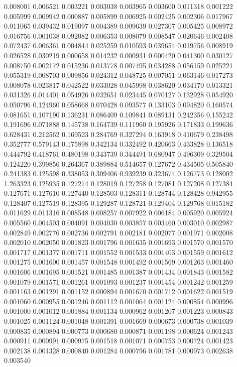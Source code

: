 0.008001
0.006521
0.003221
0.003038
0.003965
0.003600
0.011318
0.001222
0.005999
0.009942
0.000887
0.005899
0.006925
0.002425
0.002306
0.017967
0.011065
0.039432
0.019097
0.004389
0.009639
0.027307
0.005425
0.008972
0.016756
0.001038
0.092082
0.006353
0.008079
0.008547
0.020646
0.002408
0.072437
0.006361
0.004844
0.025259
0.010593
0.039654
0.019756
0.008919
0.026528
0.030219
0.000658
0.014232
0.000931
0.000420
0.041300
0.030127
0.008750
0.002172
0.015236
0.013778
0.007495
0.034288
0.056159
0.025221
0.055319
0.008703
0.009856
0.024312
0.048725
0.007051
0.063146
0.017273
0.008078
0.023817
0.042522
0.033028
0.045998
0.038620
0.034170
0.013321
0.031326
0.014401
0.054926
0.032651
0.023445
0.070127
0.132928
0.054920
0.050796
0.124960
0.058668
0.070428
0.093577
0.133103
0.094820
0.160574
0.081651
0.107190
0.136231
0.086409
0.109841
0.089131
0.242356
0.155242
0.191696
0.071888
0.145738
0.164739
0.111960
0.195926
0.171833
0.199636
0.628431
0.212562
0.169523
0.284769
0.327294
0.163918
0.410679
0.238498
0.352777
0.579143
0.175898
0.342134
0.332492
0.420663
0.433828
0.136518
0.444792
0.418761
0.480198
0.343739
0.344491
0.680947
0.496309
0.329504
0.124220
0.399856
0.264367
0.389884
0.514657
0.127672
0.434505
0.505840
0.241383
0.125598
0.338053
0.309406
0.939239
0.323674
0.126773
0.128002
1.263323
0.125935
0.127274
0.128019
0.127258
0.127081
0.127208
0.127384
0.127671
0.127610
0.127440
0.128503
0.128311
0.128744
0.128428
0.942955
0.128407
0.127519
0.128395
0.129287
0.128721
0.129404
0.129768
0.015182
0.011629
0.011316
0.008548
0.008257
0.007922
0.006184
0.005920
0.005924
0.005560
0.004503
0.004091
0.004030
0.003857
0.003460
0.003010
0.002987
0.002849
0.002776
0.002736
0.002791
0.002181
0.002077
0.001971
0.002008
0.002010
0.002050
0.001823
0.001796
0.001635
0.001693
0.001570
0.001570
0.001717
0.001377
0.001711
0.001552
0.001533
0.001403
0.001559
0.001612
0.001275
0.001600
0.001457
0.001548
0.001492
0.001569
0.001263
0.001460
0.001606
0.001695
0.001521
0.001485
0.001387
0.001434
0.001843
0.001582
0.001079
0.001571
0.001261
0.001093
0.001237
0.001454
0.001242
0.001259
0.001163
0.001291
0.001152
0.000894
0.001670
0.001712
0.001622
0.001519
0.001060
0.000955
0.001246
0.001112
0.001064
0.001124
0.000854
0.000996
0.001000
0.001012
0.001884
0.001134
0.000962
0.001207
0.001223
0.000843
0.001025
0.001124
0.001048
0.001391
0.001669
0.000673
0.000738
0.001039
0.000835
0.000894
0.000773
0.000680
0.000871
0.001198
0.000624
0.001243
0.000911
0.000991
0.000975
0.001518
0.001071
0.000753
0.000724
0.001423
0.002138
0.001328
0.000840
0.001284
0.000796
0.001781
0.000973
0.002638
0.003540
